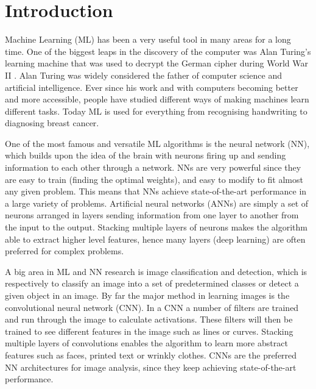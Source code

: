 \section{Introduction}

Machine Learning (ML) has been a very useful tool in many areas for a long time. One of the biggest leaps in the discovery of the computer was Alan Turing's learning machine that was used to decrypt the German cipher during World War II \cite{turing}. Alan Turing was widely considered the father of computer science and artificial intelligence\cite{Beavers2013}. Ever since his work and with computers becoming better and more accessible, people have studied different ways of making machines learn different tasks. Today ML is used for everything from recognising handwriting to diagnosing breast cancer\cite{Khuriwal2018}. 

One of the most famous and versatile ML algorithms is the neural network (NN), which builds upon the idea of the brain with neurons firing up and sending information to each other through a network. NNs are very powerful since they are easy to train (finding the optimal weights), and easy to modify to fit almost any given problem. This means that NNs achieve state-of-the-art performance in a large variety of problems. Artificial neural networks (ANNs) are simply a set of neurons arranged in layers sending information from one layer to another from the input to the output. Stacking multiple layers of neurons makes the algorithm able to extract higher level features\cite{deepLearning}, hence many layers (deep learning) are often preferred for complex problems.

A big area in ML and NN research is image classification and detection, which is respectively to classify an image into a set of predetermined classes or detect a given object in an image. By far the major method in learning images is the convolutional neural network (CNN). In a CNN a number of filters are trained and run through the image to calculate activations. These filters will then be trained to see different features in the image such as lines or curves. Stacking multiple layers of convolutions enables the algorithm to learn more abstract features such as faces, printed text or wrinkly clothes\cite{Yosinski2015}. CNNs are the preferred NN architectures for image analysis, since they keep achieving state-of-the-art performance.

